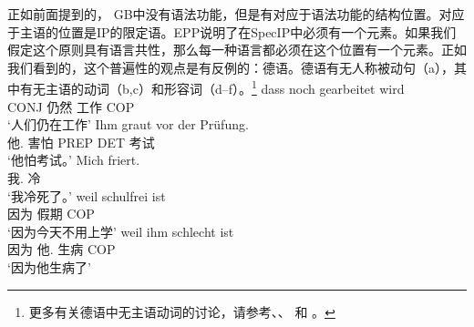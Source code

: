 正如前面提到的， GB中没有语法功能，但是有对应于语法功能的结构位置。对应于主语的位置是IP的限定语。EPP说明了在SpecIP中必须有一个元素。如果我们假定这个原则具有语言共性，那么每一种语言都必须在这个位置有一个元素。正如我们看到的，这个普遍性的观点是有反例的：德语。德语有无人称被动句（a），其中有无主语的动词（b,c）和形容词（d--f）。\footnote{%
	更多有关德语中无主语动词的讨论，请参考、、
    和 。
}
\eal
\ex 
\gll dass noch gearbeitet wird\\
	 CONJ 仍然 工作 COP\\
\glt `人们仍在工作'
\ex 
\gll Ihm graut vor der Prüfung.\\
     他.\dat{} 害怕 PREP DET 考试\\
\glt `他怕考试。'
\ex 
\gll Mich friert.\\
	 我.\acc{} 冷\\
\glt `我冷死了。'
\ex\label{ex-schulfrei}
\gll weil schulfrei ist\\
	 因为 假期 COP\\
\glt `因为今天不用上学'
\ex\label{ex-schlecht-ist}
\gll weil ihm schlecht ist\\
	 因为 他.\dat{} 生病 COP\\
\glt `因为他生病了'
